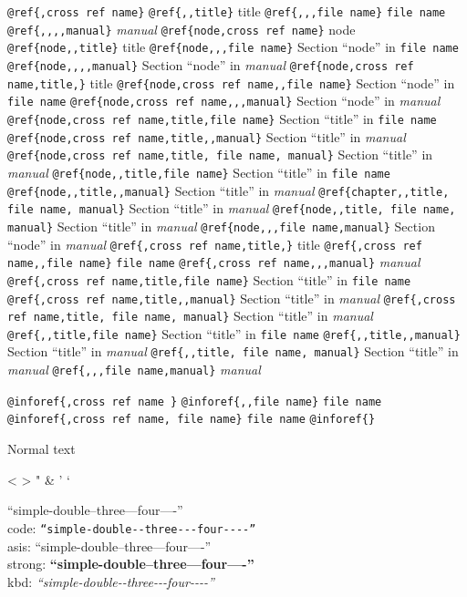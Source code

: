 \documentclass{book}
\begin{document}
\texttt{@ref\{,cross ref name\}} 
\texttt{@ref\{,,title\}} title
\texttt{@ref\{,,,file name\}} \texttt{file name}
\texttt{@ref\{,,,,manual\}} \textsl{manual}
\texttt{@ref\{node,cross ref name\}} node
\texttt{@ref\{node,,title\}} title
\texttt{@ref\{node,,,file name\}} Section ``node'' in \texttt{file name}
\texttt{@ref\{node,,,,manual\}} Section ``node'' in \textsl{manual}
\texttt{@ref\{node,cross ref name,title,\}} title
\texttt{@ref\{node,cross ref name,,file name\}} Section ``node'' in \texttt{file name}
\texttt{@ref\{node,cross ref name,,,manual\}} Section ``node'' in \textsl{manual}
\texttt{@ref\{node,cross ref name,title,file name\}} Section ``title'' in \texttt{file name}
\texttt{@ref\{node,cross ref name,title,,manual\}} Section ``title'' in \textsl{manual}
\texttt{@ref\{node,cross ref name,title, file name, manual\}} Section ``title'' in \textsl{manual}
\texttt{@ref\{node,,title,file name\}} Section ``title'' in \texttt{file name}
\texttt{@ref\{node,,title,,manual\}} Section ``title'' in \textsl{manual}
\texttt{@ref\{chapter,,title, file name, manual\}} Section ``title'' in \textsl{manual}
\texttt{@ref\{node,,title, file name, manual\}} Section ``title'' in \textsl{manual}
\texttt{@ref\{node,,,file name,manual\}} Section ``node'' in \textsl{manual}
\texttt{@ref\{,cross ref name,title,\}} title
\texttt{@ref\{,cross ref name,,file name\}} \texttt{file name}
\texttt{@ref\{,cross ref name,,,manual\}} \textsl{manual}
\texttt{@ref\{,cross ref name,title,file name\}} Section ``title'' in \texttt{file name}
\texttt{@ref\{,cross ref name,title,,manual\}} Section ``title'' in \textsl{manual}
\texttt{@ref\{,cross ref name,title, file name, manual\}} Section ``title'' in \textsl{manual}
\texttt{@ref\{,,title,file name\}} Section ``title'' in \texttt{file name}
\texttt{@ref\{,,title,,manual\}} Section ``title'' in \textsl{manual}
\texttt{@ref\{,,title, file name, manual\}} Section ``title'' in \textsl{manual}
\texttt{@ref\{,,,file name,manual\}} \textsl{manual}

\texttt{@inforef\{,cross ref name \}} 
\texttt{@inforef\{,,file name\}} \texttt{file name}
\texttt{@inforef\{,cross ref name, file name\}} \texttt{file name}
\texttt{@inforef\{\}} 



Normal text

<
>
"
\&
'
`

``simple-double--three---four----''\leavevmode{}\\
code: \texttt{``simple-double{-}{-}three{-}{-}{-}four{-}{-}{-}-''} \leavevmode{}\\
asis: ``simple-double--three---four----'' \leavevmode{}\\
strong: \textbf{``simple-double--three---four----''} \leavevmode{}\\
kbd: {\ttfamily\textsl{``simple-double{-}{-}three{-}{-}{-}four{-}{-}{-}-''}} \leavevmode{}\\
\end{document}
